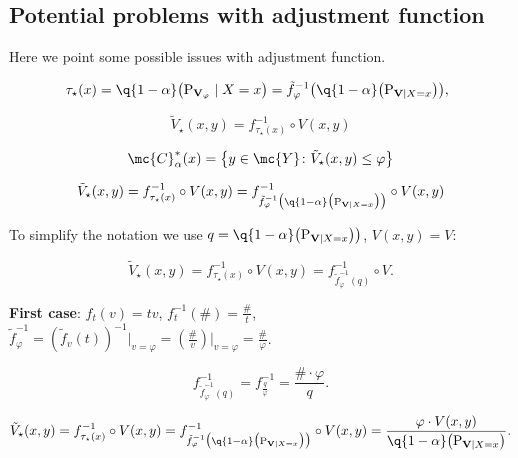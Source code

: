 \subsection{Potential problems with adjustment function}
\label{suppl:ex_adj}
Here we point some possible issues with adjustment function.

\begin{equation}
    \!\!\! \tau_\star(x) = \q{1 - \alpha}\big(\textup{P}_{\mathbf{V}_\varphi} \mid X = x\big)
    = \tilde{f}_\varphi^{-1}\bigl(\q{1 - \alpha}\bigl(\textup{P}_{\mathbf{V} \mid X = x}\bigr)\bigr),
\end{equation}

\begin{equation}
    \tilde{V}_\star(x,y)= f_{\tau_\star(x)}^{-1} \circ V(x,y)
\end{equation}

\begin{equation}
  \mc{C}_{\alpha}^*(x) = \bigl\{y \in \mc{Y}\colon \tilde{V}_\star(x, y) \leq \varphi\bigr\}
\end{equation}

\begin{equation}
    \tilde{V}_\star(x,y) = f_{\tau_\star(x)}^{-1} \circ V(x,y) = f_{\tilde{f}_\varphi^{-1}\bigl(\q{1 - \alpha}\bigl(\textup{P}_{\mathbf{V} \mid X = x}\bigr)\bigr)}^{-1} \circ V(x,y)
\end{equation}

To simplify the notation we use $q=\q{1 - \alpha}\bigl(\textup{P}_{\mathbf{V} \mid X = x}\bigr)\bigr)$, $V(x,y) = V$:

\begin{equation}
    \tilde{V}_\star(x,y) = f_{\tau_\star(x)}^{-1} \circ V(x,y) = f_{\tilde{f}_\varphi^{-1}(q)}^{-1} \circ V.
\end{equation}

\textbf{First case}: $f_t(v) = tv$,  $f_{t}^{-1}(\#)=\frac{\#}{t}$, $\tilde{f}_\varphi^{-1}=(\tilde{f}_v(t))^{-1}\vert_{v=\varphi}=(\frac{\#}{v})\vert_{v=\varphi}=\frac{\#}{\varphi}$.

\begin{equation}
    f_{\tilde{f}_\varphi^{-1}(q)}^{-1} = f_{\frac{q}{\varphi}}^{-1}= \frac{\# \cdot \varphi}{q}.
\end{equation}

\begin{equation}
    \tilde{V}_\star(x,y) = f_{\tau_\star(x)}^{-1} \circ V(x,y) = f_{\tilde{f}_\varphi^{-1}\bigl(\q{1 - \alpha}\bigl(\textup{P}_{\mathbf{V} \mid X = x}\bigr)\bigr)}^{-1} \circ V(x,y) = \frac{\varphi \cdot V(x,y)}{\q{1 - \alpha}\bigl(\textup{P}_{\mathbf{V} \mid X = x}\bigr)}.
\end{equation}

